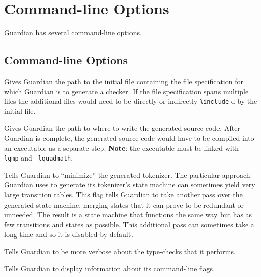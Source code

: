 
\chapter{Command-line Options}
{
	Guardian has several command-line options.
	
	\section{Command-line Options}
	{
		\begin{itemize}
		{
			\item [\texttt{-i <path>}]
			{
				Gives Guardian the path to the initial file containing the
				file specification for which Guardian is to generate a checker.
				If the file specification spans multiple
				files the additional files would need to be
				directly or indirectly \texttt{\%include}-d by the initial file.
			}
			
			\item [\texttt{-o <path>}]
			{
				Gives Guardian the path to where to write the generated source
				code. After Guardian is complete, the generated source code
				would have to be compiled into an executable as a separate step.
				\textbf{Note}: the executable must be
				linked with \texttt{-lgmp} and
				\texttt{-lquadmath}.
			}
			
			\item [\texttt{-m}]
			{
				Tells Guardian to ``minimize'' the generated tokenizer. The
				particular approach Guardian uses to generate its tokenizer's
				state machine can sometimes yield very large transition tables.
				This flag tells Guardian to take another pass over the generated
				state machine, merging states that it can prove to be redundant
				or unneeded. The result is a state machine that functions the
				same way but has as few transitions and states as
				possible.
				This additional pass can sometimes take a long
				time and so it is
				disabled by default.
			}
			
			\item [\texttt{-v}]
			{
				Tells Guardian to be more verbose about the type-checks that
				it performs.
			}
			
			\item [\texttt{-h}]
			{
				Tells Guardian to display information about its command-line
				flags.
			}
		}
		\end{itemize}
	}
}





